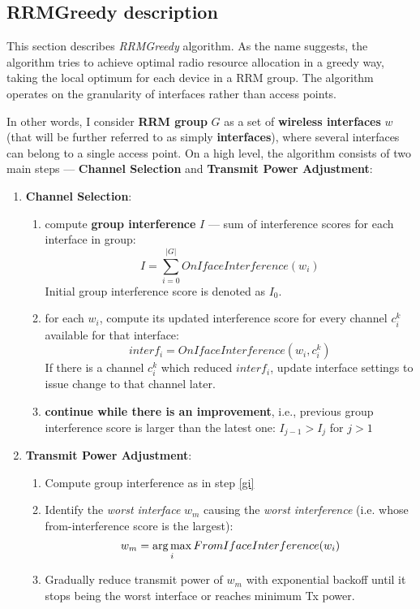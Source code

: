 \subsection{RRMGreedy description}
This section describes \textit{RRMGreedy} algorithm.
As the name suggests, the algorithm tries to achieve optimal radio resource allocation in a greedy way, taking the local optimum for each device in a RRM group.
The algorithm operates on the granularity of interfaces rather than access points.

In other words, I consider \textbf{RRM group} $G$ as a set of \textbf{wireless interfaces} $w$ (that will be further referred to as simply \textbf{interfaces}), where several interfaces can belong to a single access point.
On a high level, the algorithm consists of two main steps --- \textbf{Channel Selection} and \textbf{Transmit Power Adjustment}:
\everymath{\displaystyle} %
\begin{enumerate}
\item \textbf{Channel Selection}:
    \begin{enumerate}
        \item \label{gi} compute \textbf{group interference} $I$ --- sum of interference scores for each interface in group:
            \begin{equation}
                I = \sum_{i=0}^{\lvert G \rvert} OnIfaceInterference(w_i)
            \end{equation}
        Initial group interference score is denoted as $I_{0}$.
        \item for each $w_i$, compute its updated interference score for every channel $c^k_i$ available for that interface:
            \begin{equation}
                interf_i = OnIfaceInterference(w_i, c^k_i)
            \end{equation}
        If there is a channel $c^k_i$ which reduced $interf_i$, update interface settings to issue change to that channel later.
        \item \textbf{continue while there is an improvement}, i.e., previous group interference score is larger than the latest one:
        $I_{j-1} > I_{j}$ for $j > 1$
    \end{enumerate}
\item \textbf{Transmit Power Adjustment}:
    \begin{enumerate}
        \item Compute group interference as in step \ref{gi}
        \item Identify the \textit{worst interface} $w_m$ causing the \textit{worst interference} (i.e. whose from-interference score is the largest):
            \begin{equation}
                w_m = \operatorname*{arg\,max}_i FromIfaceInterference(w_i)
            \end{equation}
        \item Gradually reduce transmit power of $w_m$ with exponential backoff until it stops being the worst interface or reaches minimum Tx power.
    \end{enumerate}
\end{enumerate}

